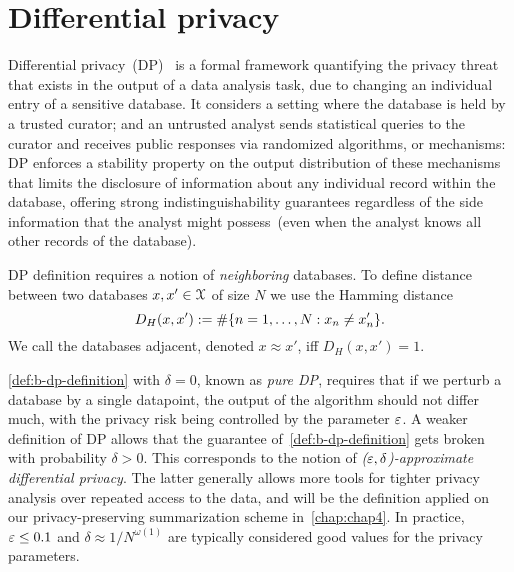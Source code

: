 \section{Differential privacy}
\label{sec:bdp}

Differential privacy~(DP)~\citep{dwork2006calibrating,dwork14} is a formal framework quantifying the privacy threat that exists in the output of a data analysis task, due to changing an individual entry of a sensitive database. It considers a setting where the database is held by a trusted curator; and an untrusted analyst sends statistical queries to the curator and receives public responses via randomized algorithms, or mechanisms: DP enforces a stability property on the output distribution of these mechanisms that limits the disclosure of information about any individual record within the database, offering strong indistinguishability guarantees regardless of the side information that the analyst might possess~(even when the analyst knows all other records of the database). 

DP definition requires a notion of \emph{neighboring} databases.
To define distance between two databases $x, x' \in \mathcal{X}$ of size $ N $ we use the Hamming distance
\[
D_{H}(x, x') := \#\{n=1,\ldots,N: x_n \neq x'_n \}.
\]
We call the databases adjacent, denoted $ x \approx x'$, iff $D_{H}(x, x')=1$.


\label{sec:b-differential-privacy}

\cref{def:b-dp-definition} with $\delta=0$, known as \emph{pure DP}, requires that if we perturb a database by a single datapoint, the output of the algorithm should not differ much, with the privacy risk being controlled by the parameter $\varepsilon$.
A weaker definition of DP allows that the guarantee of~\cref{def:b-dp-definition} gets broken with probability $\delta>0$. This corresponds to the notion of \emph{($\varepsilon, \delta$)-approximate differential privacy}. The latter generally allows more tools for tighter privacy analysis over repeated access to the data, and will be the definition applied on our privacy-preserving summarization scheme in~\cref{chap:chap4}. In practice, $\varepsilon \leq 0.1$ and $\delta \approx 1/N^{\omega(1)}$ are typically considered good values for the privacy parameters. 

